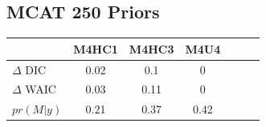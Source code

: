 \documentclass[12pt]{article}
\begin{document}
%
%	
%
%
%
%
%	
%

\clearpage
\subsection{MCAT 250 Priors}
	\begin{table}[ht!]
        \centering
        \begin{tabular}[c]{@{}lcccccc@{}}
        \hline
        & M4HC1 & M4HC3 & M4U4 \\ \hline
        \(\Delta\) DIC & 0.02 & 0.1 & 0 \\                                                
	\(\Delta\) WAIC & 0.03 & 0.11 & 0 \\                                              
	\(pr(M|y)\) & 0.21 & 0.37 & 0.42
        \end{tabular}
        \end{table}
\end{document}

